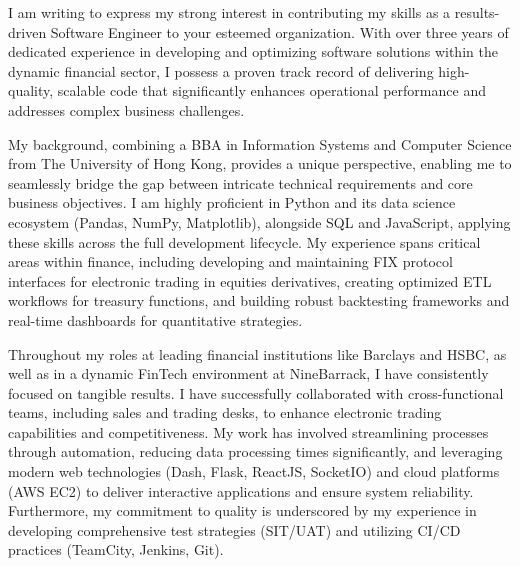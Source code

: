 \documentclass[11pt, a4paper]{article} %
\begin{document}
\medskip %

I am writing to express my strong interest in contributing my skills as a results-driven Software Engineer to your esteemed organization. With over three years of dedicated experience in developing and optimizing software solutions within the dynamic financial sector, I possess a proven track record of delivering high-quality, scalable code that significantly enhances operational performance and addresses complex business challenges.

My background, combining a BBA in Information Systems and Computer Science from The University of Hong Kong, provides a unique perspective, enabling me to seamlessly bridge the gap between intricate technical requirements and core business objectives. I am highly proficient in Python and its data science ecosystem (Pandas, NumPy, Matplotlib), alongside SQL and JavaScript, applying these skills across the full development lifecycle. My experience spans critical areas within finance, including developing and maintaining FIX protocol interfaces for electronic trading in equities derivatives, creating optimized ETL workflows for treasury functions, and building robust backtesting frameworks and real-time dashboards for quantitative strategies.

Throughout my roles at leading financial institutions like Barclays and HSBC, as well as in a dynamic FinTech environment at NineBarrack, I have consistently focused on tangible results. I have successfully collaborated with cross-functional teams, including sales and trading desks, to enhance electronic trading capabilities and competitiveness. My work has involved streamlining processes through automation, reducing data processing times significantly, and leveraging modern web technologies (Dash, Flask, ReactJS, SocketIO) and cloud platforms (AWS EC2) to deliver interactive applications and ensure system reliability. Furthermore, my commitment to quality is underscored by my experience in developing comprehensive test strategies (SIT/UAT) and utilizing CI/CD practices (TeamCity, Jenkins, Git).
\end{document}
